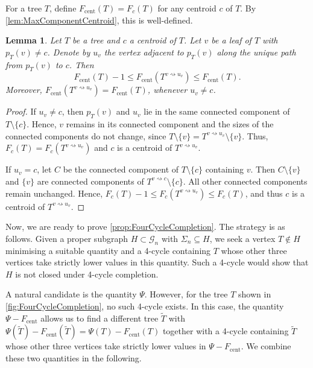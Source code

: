 \documentclass[reqno,dvipsnames]{amsart}
\theoremstyle{plain}
\newtheorem{lemma}[theorem]{Lemma}
\numberwithin{equation}{section}
\theoremstyle{definition}
\begin{document}
		For a tree $T$, define $F_{\mathrm{cent}}(T) = F_c(T)$ for any centroid $c$ of $T$. By \autoref{lem:MaxComponentCentroid}, this is well-defined.

		\begin{lemma} \label{lem:MaxComponentLeafSlide}
			Let $T$ be a tree and $c$ a centroid of $T$. Let $v$ be a leaf of $T$ with $p_T(v) \neq c$. Denote by $u_v$ the vertex adjacent to $p_T(v)$ along the unique path from $p_T(v)$ to $c$. Then
			\[
				F_\mathrm{cent}(T) - 1 \leq F_\mathrm{cent}(T^{v\rightsquigarrow u_v}) \leq F_\mathrm{cent}(T).
			\]
			Moreover, $F_\mathrm{cent}(T^{v\rightsquigarrow u_v}) = F_\mathrm{cent}(T)$, whenever $u_v \neq c$.
		\end{lemma}

		\begin{proof}
			If $u_v \neq c$, then $p_T(v)$ and $u_v$ lie in the same connected component of $T\setminus \{c\}$. Hence, $v$ remains in its connected component and the sizes of the connected components do not change, since $T\setminus \{v\} = T^{v\rightsquigarrow u_v}\setminus \{v\}$. Thus, $F_c(T) = F_c(T^{v\rightsquigarrow u_v})$ and  $c$ is a centroid of $T^{v\rightsquigarrow u_v}$.

			If $u_v = c$, let $C$ be the connected component of $T\setminus \{c\}$ containing $v$. Then $C\setminus \{v \}$ and $\{v\}$ are connected components of $T^{v\rightsquigarrow c}\setminus \{c\}$. All other connected components remain unchanged. Hence, $F_c(T)-1 \leq F_c(T^{v\rightsquigarrow u_v}) \leq F_c(T)$, and thus $c$ is a centroid of $T^{v\rightsquigarrow u_v}$. 
		\end{proof}

		Now, we are ready to prove \autoref{prop:FourCycleCompletion}. The strategy is as follows. Given a proper subgraph $H\subset \mathcal{G}_n$ with $\Sigma_n \subseteq H$, we seek a vertex $T\notin H$ minimising a suitable quantity and a 4-cycle containing $T$ whose other three vertices take strictly lower values in this quantity. Such a 4-cycle would show that $H$ is not closed under 4-cycle completion. 

		A natural candidate is the quantity $\Psi$. However, for the tree $T$ shown in \autoref{fig:FourCycleCompletion}, no such 4-cycle exists. In this case, the quantity $\Psi - F_\mathrm{cent}$ allows us to find a different tree $\tilde{T}$ with $\Psi(\tilde{T}) - F_\mathrm{cent}(\tilde{T}) = \Psi(T) - F_\mathrm{cent}(T)$ together with a 4-cycle containing $\tilde{T}$ whose other three vertices take strictly lower values in $\Psi - F_\mathrm{cent}$. We combine these two quantities in the following.
\end{document}
